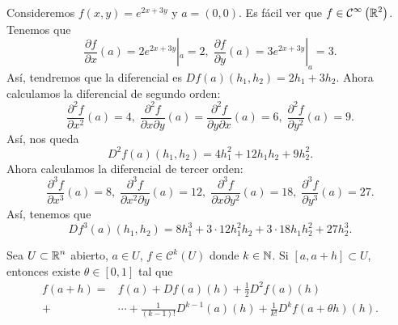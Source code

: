 \begin{eg}
Consideremos $\displaystyle f\left(x,y\right) = e^{2x+3y} $ y $\displaystyle a = \left(0,0\right) $. Es fácil ver que $\displaystyle f\in \mathcal{C}^{\infty}\left(\mathbb{R}^{2}\right) $. Tenemos que 
\[\frac{\partial f}{\partial x}\left(a\right) = 2e^{2x+3y}|_{a} = 2, \; \frac{\partial f}{\partial y}\left(a\right) = 3e^{2x+3y}|_{a} = 3 .\]
Así, tendremos que la diferencial es $\displaystyle Df\left(a\right)\left(h_{1}, h_{2}\right) = 2h_{1} + 3h_{2} $. Ahora calculamos la diferencial de segundo orden:
\[\frac{\partial^{2}f}{\partial x^{2}}\left(a\right) = 4, \; \frac{\partial^{2}f}{\partial x\partial y}\left(a\right) = \frac{\partial^{2}f}{\partial y \partial x}\left(a\right) = 6, \; \frac{\partial^{2} f}{\partial y^{2}}\left(a\right) = 9 .\]
Así, nos queda 
\[D^{2}f\left(a\right) \left(h_{1}, h_{2}\right) = 4h_{1}^{2}+12h_{1}h_{2}+9h^{2}_{2} .\]
Ahora calculamos la diferencial de tercer orden:
\[\frac{\partial^{3}f}{\partial x^{3}}\left(a\right) = 8, \; \frac{\partial^{3}f}{\partial x^{2}\partial y}\left(a\right) = 12, \; \frac{\partial^{3}f}{\partial x\partial y^{2}}\left(a\right) = 18, \; \frac{\partial^{3}f}{\partial y^{3}}\left(a\right) = 27 .\]
Así, tenemos que 
\[Df^{3}\left(a\right)\left(h_{1}, h_{2}\right) = 8h_{1}^{3} + 3 \cdot 12 h_{1}^{2}h_{2} + 3 \cdot 18 h_{1}h_{2}^{2} + 27h_{2}^{3} .\]
\end{eg}
\begin{theorem}
	Sea $\displaystyle U \subset \mathbb{R}^{n} $ abierto, $\displaystyle a \in U $, $\displaystyle f \in \mathcal{C}^{k}\left(U\right) $ donde $\displaystyle k \in \mathbb{N} $. Si $\displaystyle \left[a, a+h\right] \subset U $, entonces existe $\displaystyle \theta \in \left[0,1\right]  $ tal que 
	\[
	\begin{split}
		f\left(a+h\right) = & f\left(a\right) + Df\left(a\right)\left(h\right) + \frac{1}{2}D^{2}f\left(a\right)\left(h\right) \\
		+ &  \cdots + \frac{1}{\left(k-1\right)!}D^{k-1}\left(a\right)\left(h\right)+\frac{1}{k!}D^{k}f\left(a+\theta h\right)\left(h\right).
	\end{split}
	\]
\end{theorem}
